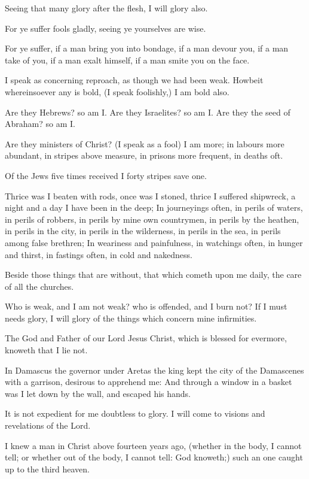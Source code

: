 \Verse Seeing that many glory after the flesh, I will glory also.

\Verse For ye suffer fools gladly, seeing ye yourselves are wise.

\Verse For ye suffer, if a man bring you into bondage, if a man devour you, if a man take of you, if a man exalt himself, if a man smite you on the face.

\Verse I speak as concerning reproach, as though we had been weak.  Howbeit whereinsoever any is bold, (I speak foolishly,) I am bold also.

\Verse Are they Hebrews? so am I. Are they Israelites? so am I. Are they the seed of Abraham? so am I.

\Verse Are they ministers of Christ? (I speak as a fool) I am more; in labours more abundant, in stripes above measure, in prisons more frequent, in deaths oft.

\Verse Of the Jews five times received I forty stripes save one.

\Verse Thrice was I beaten with rods, once was I stoned, thrice I suffered shipwreck, a night and a day I have been in the deep; \Verse In journeyings often, in perils of waters, in perils of robbers, in perils by mine own countrymen, in perils by the heathen, in perils in the city, in perils in the wilderness, in perils in the sea, in perils among false brethren; \Verse In weariness and painfulness, in watchings often, in hunger and thirst, in fastings often, in cold and nakedness.

\Verse Beside those things that are without, that which cometh upon me daily, the care of all the churches.

\Verse Who is weak, and I am not weak? who is offended, and I burn not?  \Verse If I must needs glory, I will glory of the things which concern mine infirmities.

\Verse The God and Father of our Lord Jesus Christ, which is blessed for evermore, knoweth that I lie not.

\Verse In Damascus the governor under Aretas the king kept the city of the Damascenes with a garrison, desirous to apprehend me: \Verse And through a window in a basket was I let down by the wall, and escaped his hands.


\Chapter
\Verse It is not expedient for me doubtless to glory. I will come to visions and revelations of the Lord.

\Verse I knew a man in Christ above fourteen years ago, (whether in the body, I cannot tell; or whether out of the body, I cannot tell: God knoweth;) such an one caught up to the third heaven.

